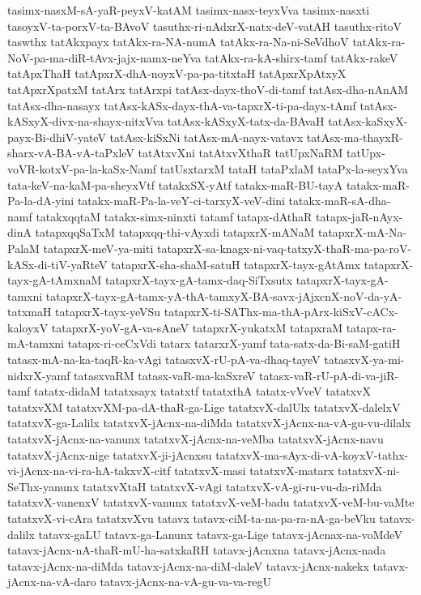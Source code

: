 {tasimx-nasxM-sA-yaR-peyxV-katAM
tasimx-nasx-teyxVva
tasimx-nasxti
tasoyxV-ta-porxV-ta-BAvoV
tasuthx-ri-nAdxrX-natx-deV-vatAH
tasuthx-ritoV
taswthx
tatAkxpayx
tatAkx-ra-NA-numA
tatAkx-ra-Na-ni-SeVdhoV
tatAkx-ra-NoV-pa-ma-diR-tAvx-jajx-namx-neYva
tatAkx-ra-kA-shirx-tamf
tatAkx-rakeV
tatApxThaH
tatApxrX-dhA-noyxV-pa-pa-titxtaH
tatApxrXpAtxyX
tatApxrXpatxM
tatArx
tatArxpi
tatAsx-dayx-thoV-di-tamf
tatAsx-dha-nAnAM
tatAsx-dha-nasayx
tatAsx-kASx-dayx-thA-va-tapxrX-ti-pa-dayx-tAmf
tatAsx-kASxyX-divx-na-shayx-nitxVva
tatAsx-kASxyX-tatx-da-BAvaH
tatAsx-kaSxyX-payx-Bi-dhiV-yateV
tatAsx-kiSxNi
tatAsx-mA-nayx-vatavx
tatAsx-ma-thayxR-sharx-vA-BA-vA-taPxleV
tatAtxvXni
tatAtxvXthaR
tatUpxNaRM
tatUpx-voVR-kotxV-pa-la-kaSx-Namf
tatUsxtarxM
tataH
tataPxlaM
tataPx-la-seyxYva
tata-keV-na-kaM-pa-sheyxVtf
tatakxSX-yAtf
tatakx-maR-BU-tayA
tatakx-maR-Pa-la-dA-yini
tatakx-maR-Pa-la-veY-ci-tarxyX-veV-dini
tatakx-maR-sA-dha-namf
tatakxqqtaM
tatakx-simx-ninxti
tatamf
tatapx-dAthaR
tatapx-jaR-nAyx-dinA
tatapxqqSaTxM
tatapxqq-thi-vAyxdi
tatapxrX-mANaM
tatapxrX-mA-Na-PalaM
tatapxrX-meV-ya-miti
tatapxrX-sa-knagx-ni-vaq-tatxyX-thaR-ma-pa-roV-kASx-di-tiV-yaRteV
tatapxrX-sha-shaM-satuH
tatapxrX-tayx-gAtAmx
tatapxrX-tayx-gA-tAmxnaM
tatapxrX-tayx-gA-tamx-daq-SiTxsutx
tatapxrX-tayx-gA-tamxni
tatapxrX-tayx-gA-tamx-yA-thA-tamxyX-BA-savx-jAjxcnX-noV-da-yA-tatxmaH
tatapxrX-tayx-yeVSu
tatapxrX-ti-SAThx-ma-thA-pArx-kiSxV-cACx-kaloyxV
tatapxrX-yoV-gA-va-sAneV
tatapxrX-yukatxM
tatapxraM
tatapx-ra-mA-tamxni
tatapx-ri-ceCxVdi
tatarx
tatarxrX-yamf
tata-satx-da-Bi-saM-gatiH
tatasx-mA-na-ka-taqR-ka-vAgi
tatasxvX-rU-pA-va-dhaq-tayeV
tatasxvX-ya-mi-nidxrX-yamf
tatasxvaRM
tatasx-vaR-ma-kaSxreV
tatasx-vaR-rU-pA-di-va-jiR-tamf
tatatx-didaM
tatatxsayx
tatatxtf
tatatxthA
tatatx-vVveV
tatatxvX
tatatxvXM
tatatxvXM-pa-dA-thaR-ga-Lige
tatatxvX-dalUlx
tatatxvX-dalelxV
tatatxvX-ga-Lalilx
tatatxvX-jAcnx-na-diMda
tatatxvX-jAcnx-na-vA-gu-vu-dilalx
tatatxvX-jAcnx-na-vanunx
tatatxvX-jAcnx-na-veMba
tatatxvX-jAcnx-navu
tatatxvX-jAcnx-nige
tatatxvX-ji-jAcnxsu
tatatxvX-ma-sAyx-di-vA-koyxV-tathx-vi-jAcnx-na-vi-ra-hA-takxvX-citf
tatatxvX-masi
tatatxvX-matarx
tatatxvX-ni-SeThx-yanunx
tatatxvXtaH
tatatxvX-vAgi
tatatxvX-vA-gi-ru-vu-da-riMda
tatatxvX-vanenxV
tatatxvX-vanunx
tatatxvX-veM-badu
tatatxvX-veM-bu-vaMte
tatatxvX-vi-cAra
tatatxvXvu
tatavx
tatavx-ciM-ta-na-pa-ra-nA-ga-beVku
tatavx-dalilx
tatavx-gaLU
tatavx-ga-Lanunx
tatavx-ga-Lige
tatavx-jAcnax-na-voMdeV
tatavx-jAcnx-nA-thaR-mU-ha-satxkaRH
tatavx-jAcnxna
tatavx-jAcnx-nada
tatavx-jAcnx-na-diMda
tatavx-jAcnx-na-diM-daleV
tatavx-jAcnx-nakekx
tatavx-jAcnx-na-vA-daro
tatavx-jAcnx-na-vA-gu-va-va-regU
}
